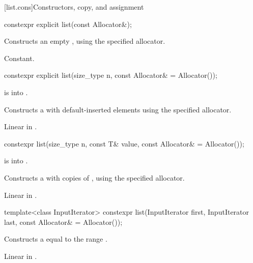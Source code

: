 [list.cons]{Constructors, copy, and assignment}

%
\begin{itemdecl}
constexpr explicit list(const Allocator&);
\end{itemdecl}

\begin{itemdescr}
\pnum
\effects
Constructs an empty , using the specified allocator.

\pnum
\complexity
Constant.
\end{itemdescr}

%
\begin{itemdecl}
constexpr explicit list(size_type n, const Allocator& = Allocator());
\end{itemdecl}

\begin{itemdescr}
\pnum
\expects
{} is  into .

\pnum
\effects
Constructs a  with
 default-inserted elements using the specified allocator.

\pnum
\complexity
Linear in
.
\end{itemdescr}

%
\begin{itemdecl}
constexpr list(size_type n, const T& value, const Allocator& = Allocator());
\end{itemdecl}

\begin{itemdescr}
\pnum
\expects
{} is  into .

\pnum
\effects
Constructs a
with
copies of
,
using the specified allocator.

\pnum
\complexity
Linear in
.
\end{itemdescr}

%
\begin{itemdecl}
template<class InputIterator>
  constexpr list(InputIterator first, InputIterator last, const Allocator& = Allocator());
\end{itemdecl}

\begin{itemdescr}
\pnum
\effects
Constructs a
equal to the range
.

\pnum
\complexity
Linear in
.
\end{itemdescr}


